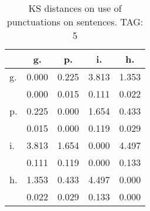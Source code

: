 \begin{table}[h!]
\begin{center}
\begin{tabular}{| l | c | c | c | c |}\hline
 & g. & p. & i. & h. \\\hline
g. & 0.000  & 0.225  & 3.813  & 1.353 \\\hline
 & 0.000  & 0.015  & 0.111  & 0.022 \\\hline
p. & 0.225  & 0.000  & 1.654  & 0.433 \\\hline
 & 0.015  & 0.000  & 0.119  & 0.029 \\\hline
i. & 3.813  & 1.654  & 0.000  & 4.497 \\\hline
 & 0.111  & 0.119  & 0.000  & 0.133 \\\hline
h. & 1.353  & 0.433  & 4.497  & 0.000 \\\hline
 & 0.022  & 0.029  & 0.133  & 0.000 \\\hline
\end{tabular}
\caption{KS distances on use of punctuations on sentences. TAG: 5}
\end{center}
\end{table}